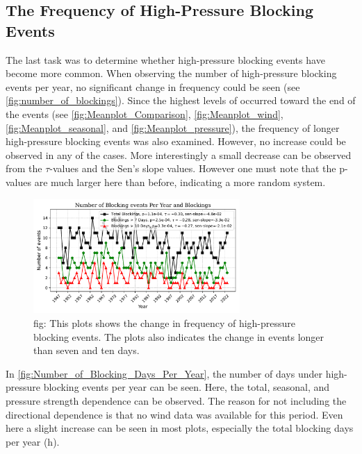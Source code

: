 \subsection{The Frequency of High-Pressure Blocking Events}
The last task was to determine whether high-pressure blocking events have become more common. When observing the number of high-pressure blocking events per year, no significant change in frequency could be seen (see \autoref{fig:number_of_blockings}). Since the highest levels of \PM  occurred toward the end of the events (see \autoref{fig:Meanplot_Comparison}, \autoref{fig:Meanplot_wind}, \autoref{fig:Meanplot_seasonal}, and \autoref{fig:Meanplot_pressure}), the frequency of longer high-pressure blocking events was also examined. However, no increase could be observed in any of the cases. More interestingly a small decrease can be observed from the $\tau$-values and the Sen's slope values. However one must note that the p-values are much larger here than before, indicating a more random system. 

\begin{figure}[H]
    \centering
    \includegraphics[width=0.7\textwidth]{Figures/BlockingsPerYear.pdf}
    \caption{fig: This plots shows the change in frequency of high-pressure blocking events. The plots also indicates the change in events longer than seven and ten days. }
    \label{fig:number_of_blockings}
\end{figure}

In \autoref{fig:Number_of_Blocking_Days_Per_Year}, the number of days under high-pressure blocking events per year can be seen. Here, the total, seasonal, and pressure strength dependence can be observed. The reason for not including the directional dependence is that no wind data was available for this period. Even here a slight increase can be seen in most plots, especially the total blocking days per year (h). 


